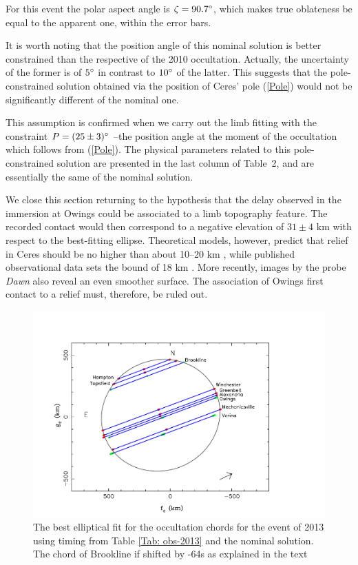 \documentclass[useAMS,usenatbib]{mn2e}
\begin{document}
For this event the polar aspect angle is $\zeta = 90.7\hbox{$^\circ$}$, which makes true oblateness be equal to the apparent one, within the error bars.

It is worth noting that the position angle of this nominal solution is better constrained than the respective of the 2010 occultation. Actually, the uncertainty of the former is of $5\hbox{$^\circ$}$ in contrast to $10\hbox{$^\circ$}$ of the latter. This suggests that the pole-constrained solution obtained via the position of Ceres' pole (\ref{Pole}) would not be significantly different of the nominal one.

This assumption is confirmed when we carry out the limb fitting with the constraint $P = (25 \pm 3)\hbox{$^\circ$}$ --the position angle at the moment of the occultation which follows from (\ref{Pole}). The physical parameters related to this pole-constrained solution are presented in the last column of Table~2, and are essentially the same of the nominal solution.

We close this section returning to the hypothesis that the delay observed in the immersion at Owings could be associated to a limb topography feature. The recorded contact would then correspond to a negative elevation of $31 \pm 4$ km with respect to the best-fitting ellipse. Theoretical models, however, predict that relief in Ceres should be no higher than about 10--20 km \citep{Johnson1973}, while published observational data sets the bound of 18 km \citep{Carry2008}. More recently, images by the probe \textit{Dawn} also reveal an even smoother surface. The association of Owings first contact to a relief must, therefore, be ruled out.

\begin{figure}
\includegraphics[scale=0.36]{figures/Ceres_2013_body.pdf}
\caption{The best elliptical fit for the occultation chords for the event of 2013 using timing from Table \ref{Tab: obs-2013} and the nominal solution. The chord of Brookline if shifted by -64s as explained in the text\label{Fig: Ceres-2013-body}}
\end{figure}
\end{document}
